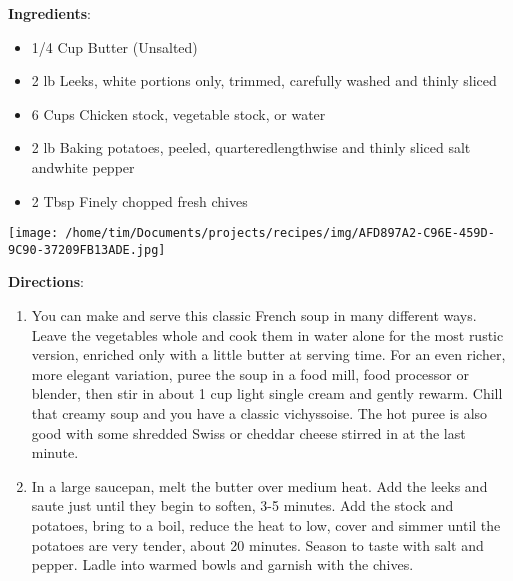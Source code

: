 \documentclass[11pt, twoside, openany]{book}
\begin{document}
\begin{minipage}[t]{0.8\linewidth}
\textbf{Ingredients}:\vspace{-3mm}
\begin{multicols}{2}
\begin{itemize}\setlength\itemsep{-1mm}
\item 1/4 Cup Butter (Unsalted)
\item 2 lb Leeks, white portions only, trimmed, carefully washed and thinly sliced
\item 6 Cups Chicken stock, vegetable stock, or water
\item 2 lb Baking potatoes, peeled, quarteredlengthwise and thinly sliced salt andwhite pepper
\item 2 Tbsp Finely chopped fresh chives
\end{itemize}
\end{multicols}
\end{minipage}
\begin{minipage}[t]{0.2\linewidth}
\centering \strut\vspace*{-\baselineskip}\newline
\texttt{[image: /home/tim/Documents/projects/recipes/img/AFD897A2-C96E-459D-9C90-37209FB13ADE.jpg]}\\
\end{minipage}\vspace{3mm}
\textbf{Directions}:
\vspace{-3mm}\begin{enumerate}\setlength\itemsep{-1mm}
\item You can make and serve this classic French soup in many different ways. Leave the vegetables whole and cook them in water alone for the most rustic version, enriched only with a little butter at serving time. For an even richer, more elegant variation, puree the soup in a food mill, food processor or blender, then stir in about 1 cup light single cream and gently rewarm. Chill that creamy soup and you have a classic vichyssoise. The hot puree is also good with some shredded Swiss or cheddar cheese stirred in at the last minute.
\item In a large saucepan, melt the butter over medium heat. Add the leeks and saute just until they begin to soften, 3-5 minutes. Add the stock and potatoes, bring to a boil, reduce the heat to low, cover and simmer until the potatoes are very tender, about 20 minutes. Season to taste with salt and pepper. Ladle into warmed bowls and garnish with the chives.
\end{enumerate}
\end{document}
